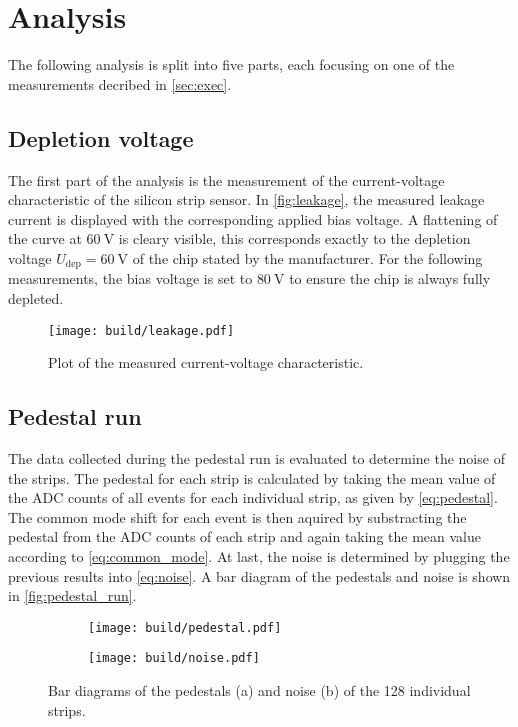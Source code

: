 \section{Analysis}
\label{sec:Analysis}

The following analysis is split into five parts, each focusing on one of the measurements decribed in \autoref{sec:exec}.

\subsection{Depletion voltage}

The first part of the analysis is the measurement of the current-voltage characteristic of the
silicon strip sensor. In \autoref{fig:leakage}, the measured leakage current is displayed with
the corresponding applied bias voltage. A flattening of the curve at $\qty{60}{\volt}$ is cleary
visible, this corresponds exactly to the depletion voltage $U_{\text{dep}}=\qty{60}{\volt}$ of
the chip stated by the manufacturer. For the following measurements, the bias voltage is
set to $\qty{80}{\volt}$ to ensure the chip is always fully depleted.

\begin{figure}[H]
  \centering
  \texttt{[image: build/leakage.pdf]}
  \caption{Plot of the measured current-voltage characteristic.}
  \label{fig:leakage}
\end{figure}

\subsection{Pedestal run}

The data collected during the pedestal run is evaluated to determine the noise of the strips. The pedestal
for each strip is calculated by taking the mean value of the ADC counts of all events for each individual strip,
as given by \eqref{eq:pedestal}. The common mode shift for each event is then aquired by substracting
the pedestal from the ADC counts of each strip and again taking the mean value according to
\eqref{eq:common_mode}. At last, the noise is determined by plugging the previous results into \eqref{eq:noise}.
A bar diagram of the pedestals and noise is shown in \autoref{fig:pedestal_run}.

\begin{figure}[H]
  \centering
    \begin{subfigure}{0.45\textwidth}
      \texttt{[image: build/pedestal.pdf]}
      \caption{}
      \label{fig:pedestals}
    \end{subfigure}
    \begin{subfigure}{0.45\textwidth}
      \texttt{[image: build/noise.pdf]}
      \caption{}
      \label{fig:noise}
    \end{subfigure} 
  \caption{Bar diagrams of the pedestals (a) and noise (b) of the 128 individual strips.}
  \label{fig:pedestal_run}
\end{figure}


